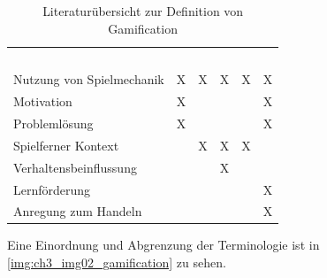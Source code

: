 \begin{table}
\footnotesize
    \begin{tabular}{llllll}
    ~                         & \textcite{Zichermann.2011} & \textcite{Deterding.2011} & \textcite{Breuer.2011} & \textcite{Oxford.2013} & \textcite{Kapp.2012} \\
    Nutzung von Spielmechanik & X                             & X                      & X             & X             & X           \\
    Motivation                & X                             & ~                      & ~             & ~             & X           \\
    Problemlösung             & X                             & ~                      & ~             & ~             & X           \\
    Spielferner Kontext       & ~                             & X                      & X             & X             & ~           \\
    Verhaltensbeinflussung    & ~                             & ~                      & X             & ~             & ~           \\
    Lernförderung             & ~                             & ~                      & ~             & ~             & X           \\
    Anregung zum Handeln      & ~                             & ~                      & ~             & ~             & X           \\
    \end{tabular}
    \label{table:ch3:lit_overview}
    \caption{Literaturübersicht zur Definition von Gamification}
\end{table}

Eine Einordnung und Abgrenzung der Terminologie ist in \ref{img:ch3_img02_gamification} zu sehen.

